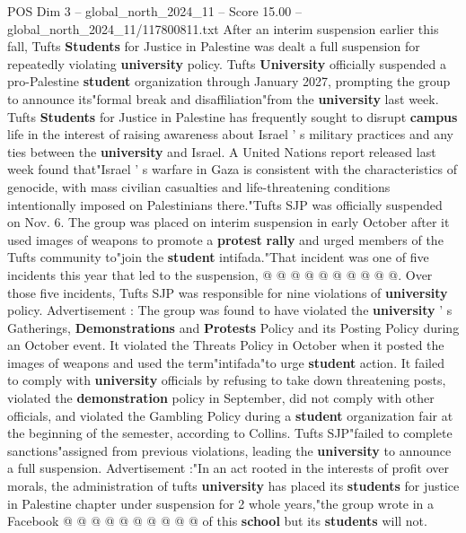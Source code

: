 \begin{textsample}{POS Dim 3 – global\_north\_2024\_11 – Score 15.00 – global\_north\_2024\_11/117800811.txt}  \label{ex:f3_pos_186}
After an interim suspension earlier this fall, Tufts \textbf{Students} for Justice in Palestine was dealt a full suspension for repeatedly violating \textbf{university} policy.
Tufts \textbf{University} officially suspended a pro-Palestine \textbf{student} organization through January 2027, prompting the group to announce its"formal break and disaffiliation"from the \textbf{university} last week.
Tufts \textbf{Students} for Justice in Palestine has frequently sought to disrupt \textbf{campus} life in the interest of raising awareness about Israel ' s military practices and any ties between the \textbf{university} and Israel.
A United Nations report released last week found that"Israel ' s warfare in Gaza is consistent with the characteristics of genocide, with mass civilian casualties and life-threatening conditions intentionally imposed on Palestinians there."Tufts SJP was officially suspended on Nov. 6.
The group was placed on interim suspension in early October after it used images of weapons to promote a \textbf{protest} \textbf{rally} and urged members of the Tufts community to"join the \textbf{student} intifada."That incident was one of five incidents this year that led to the suspension, @ @ @ @ @ @ @ @ @ @.
Over those five incidents, Tufts SJP was responsible for nine violations of \textbf{university} policy.
Advertisement : The group was found to have violated the \textbf{university} ' s Gatherings, \textbf{Demonstrations} and \textbf{Protests} Policy and its Posting Policy during an October event.
It violated the Threats Policy in October when it posted the images of weapons and used the term"intifada"to urge \textbf{student} action.
It failed to comply with \textbf{university} officials by refusing to take down threatening posts, violated the \textbf{demonstration} policy in September, did not comply with other officials, and violated the Gambling Policy during a \textbf{student} organization fair at the beginning of the semester, according to Collins.
Tufts SJP"failed to complete sanctions"assigned from previous violations, leading the \textbf{university} to announce a full suspension.
Advertisement :"In an act rooted in the interests of profit over morals, the administration of tufts \textbf{university} has placed its \textbf{students} for justice in Palestine chapter under suspension for 2 whole years,"the group wrote in a Facebook @ @ @ @ @ @ @ @ @ @ of this \textbf{school} but its \textbf{students} will not.

\end{textsample}
